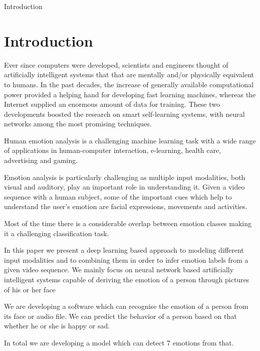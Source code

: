 \begin{center}
	{\Huge Introduction}
\end{center}

\section{Introduction}
Ever since computers were developed, scientists and engineers thought of artificially intelligent systems that that are mentally and/or physically equivalent to humans. In the past decades, the increase of generally available computational power provided a helping hand for developing fast learning machines, whereas the Internet supplied an enormous amount of data for training. These two developments boosted the research on smart self-learning systems, with neural networks among the most promising techniques.\newline

Human emotion analysis is a challenging machine learning task with a wide range of applications in human-computer interaction, e-learning, health care, advertising and gaming.\newline

Emotion analysis is particularly challenging as multiple input modalities, both visual and auditory, play an important role in understanding it. Given a video sequence with a human subject, some of the important cues which help to understand the user’s emotion are facial expressions, movements and activities.\newline

Most of the time there is a considerable overlap between emotion classes making it a challenging classification task.\newline

In this paper we present a deep learning based approach to modeling different input modalities and to combining them in order to infer emotion labels from a given video sequence. We mainly focus on neural network based artificially intelligent systems capable of deriving the emotion of a person through pictures of his or her face\newline

We are developing a software which can recognise the emotion of  a person from its face or audio file. We can predict the behavior of a person based on that whether he or she is happy or sad. \newline 

In total we are developing a model which can detect 7 emotions from that.

